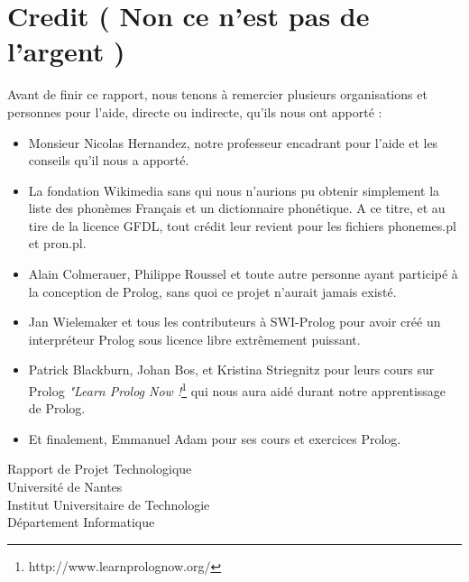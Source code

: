 \documentclass[11pt]{report}
\begin{document}
	\section{Credit ( Non ce n'est pas de l'argent )}
	Avant de finir ce rapport, nous tenons à remercier plusieurs organisations et personnes pour l'aide, directe ou indirecte, qu'ils nous ont apporté :
	\begin{itemize}
		\item Monsieur Nicolas Hernandez, notre professeur encadrant pour l'aide et les conseils qu'il nous a apporté.
		\item La fondation Wikimedia sans qui nous n'aurions pu obtenir simplement la liste des phonèmes Français et un dictionnaire phonétique. A ce titre, et au tire de la licence GFDL, tout crédit leur revient pour les fichiers phonemes.pl et pron.pl.
		\item Alain Colmerauer, Philippe Roussel et toute autre personne ayant participé à la conception de Prolog, sans quoi ce projet n'aurait jamais existé.
		\item Jan Wielemaker et tous les contributeurs à SWI-Prolog pour avoir créé un interpréteur Prolog sous licence libre extrêmement puissant.
		\item  Patrick Blackburn, Johan Bos, et Kristina Striegnitz pour leurs cours sur Prolog {\em "Learn Prolog Now !}\footnote{http://www.learnprolognow.org/} qui nous aura aidé durant notre apprentissage de Prolog.
		\item Et finalement, Emmanuel Adam pour ses cours et exercices Prolog.
	\end{itemize}
	
	\newpage
	
	\begin{center}
		\Huge Rapport de Projet Technologique\\
		\bigskip 
		\bigskip 
		\bigskip 
		\bigskip 
		\LARGE Université de Nantes\\ Institut Universitaire de Technologie\\ Département Informatique
	\end{center}
\end{document}
